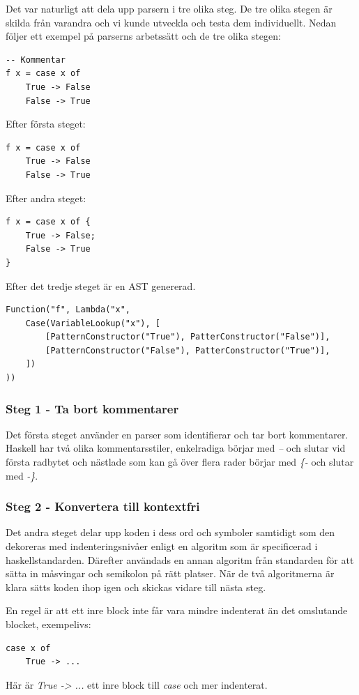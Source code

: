 Det var naturligt att dela upp parsern i tre olika steg. De tre olika stegen är skilda från varandra och vi kunde utveckla och testa dem individuellt.
Nedan följer ett exempel på parserns arbetssätt och de tre olika stegen:
\begin{lstlisting}
-- Kommentar
f x = case x of
    True -> False
    False -> True
\end{lstlisting}

Efter första steget:
\begin{lstlisting}
f x = case x of
    True -> False
    False -> True
\end{lstlisting}

Efter andra steget:
\begin{lstlisting}
f x = case x of {
    True -> False;
    False -> True
}
\end{lstlisting}

Efter det tredje steget är en AST genererad.
\begin{lstlisting}
Function("f", Lambda("x", 
    Case(VariableLookup("x"), [
        [PatternConstructor("True"), PatterConstructor("False")],
        [PatternConstructor("False"), PatterConstructor("True")],
    ])
))
\end{lstlisting}

\subsubsection{Steg 1 - Ta bort kommentarer}
Det första steget använder en parser som identifierar och tar bort kommentarer. 
Haskell har två olika kommentarsstiler, enkelradiga börjar med \emph{--} och slutar vid första radbytet och 
nästlade som kan gå över flera rader börjar med \emph{\{-} och slutar med \emph{-\}}.

\subsubsection{Steg 2 - Konvertera till kontextfri}
Det andra steget delar upp koden i dess ord och symboler samtidigt som den dekoreras med indenteringsnivåer enligt en algoritm %
som är specificerad i haskellstandarden. Därefter användads en annan algoritm från standarden för att sätta in måsvingar och semikolon på rätt platser. %
När de två algoritmerna är klara sätts koden ihop igen och skickas vidare till nästa steg.

En regel är att ett inre block inte får vara mindre indenterat än det omslutande blocket, exempelivs:
\begin{lstlisting}
case x of
    True -> ...
\end{lstlisting}
Här är \emph{True -> ...} ett inre block till \emph{case} och mer indenterat.

